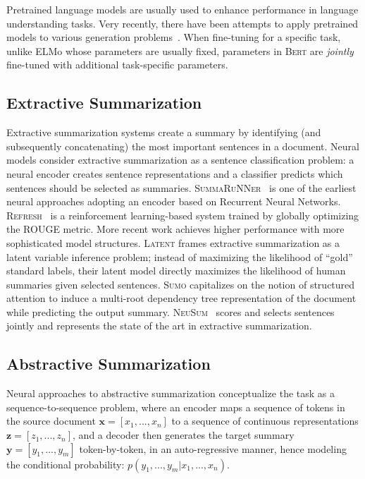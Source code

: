 \documentclass[11pt,a4paper]{article}
\begin{document}
    Pretrained language models are usually used to enhance performance
in language understanding tasks.  Very recently, there have been
attempts to apply pretrained models to various generation
problems~\cite{edunov2019pre,rothe2019leveraging}.  When
fine-tuning for a specific task, unlike ELMo whose parameters are
usually fixed, parameters in \textsc{Bert} are \emph{jointly}
fine-tuned with additional task-specific parameters.

    
    
    \subsection{Extractive Summarization}
    \label{sec:extr-summ-1}
    Extractive summarization systems create a summary by identifying (and
    subsequently concatenating) the most important sentences in a
    document.  
Neural models consider extractive summarization as a sentence
    classification problem: a neural encoder creates sentence
    representations and a classifier predicts which sentences should be
    selected as summaries.
    \textsc{SummaRuNNer}~\cite{nallapati2017summarunner} is one of the
    earliest neural approaches adopting an encoder based on Recurrent
    Neural Networks.  \textsc{Refresh}~\cite{narayan2018ranking} is a
    reinforcement learning-based system trained by globally optimizing the
    ROUGE metric.  More recent work achieves higher performance with more
    sophisticated model structures.  \textsc{Latent}
    \cite{zhang2018neural} frames extractive summarization as a latent
    variable inference problem; instead of maximizing the likelihood of
    ``gold'' standard labels, their latent model directly maximizes the
    likelihood of human summaries given selected sentences.  
    \textsc{Sumo}
    \cite{yang19sumo} capitalizes on the notion of structured attention to
    induce a multi-root dependency tree representation of the document
    while predicting the output summary.
    \textsc{NeuSum}~\cite{zhou2018neural} scores and selects sentences
    jointly and represents the state of the art in extractive
    summarization.
    
    
    \subsection{Abstractive Summarization}
    \label{sec:abstr-summ-1}
    
    Neural approaches to abstractive summarization conceptualize the task
    as a sequence-to-sequence problem,
where an encoder maps a sequence of tokens in the source document
    $\bm{x} = [x_1, ..., x_n]$ to a sequence of continuous
    representations $\bm{z} = [z_1, ..., z_n]$, and a decoder then
    generates the target summary $\bm{y} = [y_1, ..., y_m]$
    token-by-token, in an auto-regressive manner, hence modeling the
    conditional probability: $p(y_1, ..., y_m|x_1, ..., x_n)$.
    
\end{document}
